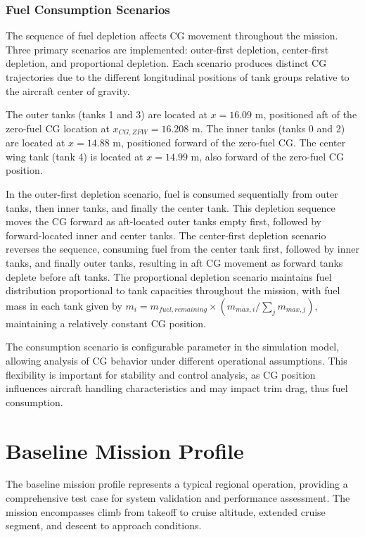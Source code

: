 \subsubsection{Fuel Consumption Scenarios}

The sequence of fuel depletion affects CG movement throughout the mission. Three primary scenarios are implemented: outer-first depletion, center-first depletion, and proportional depletion. Each scenario produces distinct CG trajectories due to the different longitudinal positions of tank groups relative to the aircraft center of gravity.

The outer tanks (tanks 1 and 3) are located at $x = 16.09$ m, positioned aft of the zero-fuel CG location at $x_{CG,ZFW} = 16.208$ m. The inner tanks (tanks 0 and 2) are located at $x = 14.88$ m, positioned forward of the zero-fuel CG. The center wing tank (tank 4) is located at $x = 14.99$ m, also forward of the zero-fuel CG position.

In the outer-first depletion scenario, fuel is consumed sequentially from outer tanks, then inner tanks, and finally the center tank. This depletion sequence moves the CG forward as aft-located outer tanks empty first, followed by forward-located inner and center tanks. The center-first depletion scenario reverses the sequence, consuming fuel from the center tank first, followed by inner tanks, and finally outer tanks, resulting in aft CG movement as forward tanks deplete before aft tanks. The proportional depletion scenario maintains fuel distribution proportional to tank capacities throughout the mission, with fuel mass in each tank given by $m_i = m_{fuel,remaining} \times (m_{max,i} / \sum_j m_{max,j})$, maintaining a relatively constant CG position.

The consumption scenario is configurable parameter in the simulation model, allowing analysis of CG behavior under different operational assumptions. This flexibility is important for stability and control analysis, as CG position influences aircraft handling characteristics and may impact trim drag, thus fuel consumption.

\section{Baseline Mission Profile}

The baseline mission profile represents a typical regional operation, providing a comprehensive test case for system validation and performance assessment. The mission encompasses climb from takeoff to cruise altitude, extended cruise segment, and descent to approach conditions.

